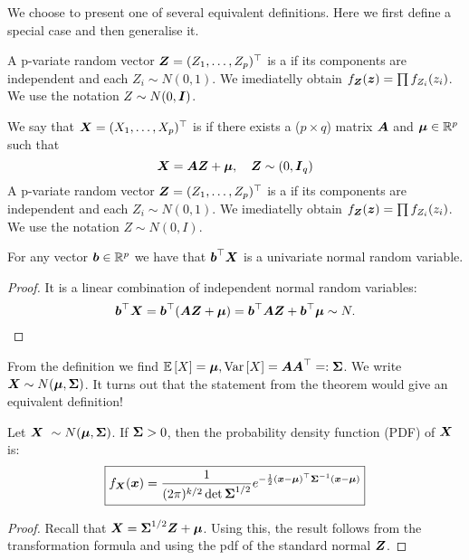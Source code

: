 We choose to present one of several equivalent definitions. Here we first define a special case and then generalise it. 
\begin{definition}
    A p-variate random vector $\boldsymbol{Z}=(Z_1, \dots, Z_p)^\top$ is a  if its components are independent and each $Z_i\sim N(0,1)$. We imediatelly obtain $f_{\boldsymbol{Z}}(\boldsymbol{z}) = \prod f_{Z_i} (z_i)$. We use the notation $Z\sim N(0, \boldsymbol{I})$.
\end{definition}
\begin{definition}
    We say that $\boldsymbol{X} = (X_1,\dots, X_p)^\top$ is  if there exists a ($p\times q$) matrix $\boldsymbol{A}$ and $\boldsymbol{\mu}\in\mathbb{R}^p$ such that 
    $$
        \boldsymbol{X} = \boldsymbol{A} \boldsymbol{Z} + \boldsymbol{\mu}, \quad \boldsymbol{Z} \sim (0, \boldsymbol{I}_q)
    $$
    A p-variate random vector $\boldsymbol{Z}=(Z_1, \dots, Z_p)^\top$ is a  if its components are independent and each $Z_i\sim N(0,1)$. We imediatelly obtain $f_{\boldsymbol{Z}}(\boldsymbol{z}) = \prod f_{Z_i} (z_i)$. We use the notation $Z\sim N(0, I)$.
\end{definition}
\begin{theorem}
    For any vector $\boldsymbol{b}\in\mathbb{R}^p$ we have that $\boldsymbol{b}^\top \boldsymbol{X}$ is a univariate normal random variable.
\end{theorem}
\begin{proof}
    It is a linear combination of independent normal random variables:
    $$
        \boldsymbol{b}^\top \boldsymbol{X} = \boldsymbol{b}^\top(\boldsymbol{A}\boldsymbol{Z} + \boldsymbol{\mu}) = \boldsymbol{b}^\top \boldsymbol{A} \boldsymbol{Z} + \boldsymbol{b}^\top\boldsymbol{\mu} \sim N. 
    $$
\end{proof}
From the definition we find $\mathbb{E}\left[X\right] = \boldsymbol{\mu}, \mathrm{Var}\left[X\right] = \boldsymbol{A}\boldsymbol{A}^\top =: \boldsymbol{\Sigma}$. We write $\X \sim N(\M, \SS)$. It turns out that the statement from the theorem would give an equivalent definition!
\begin{theorem}
    Let $\X \sim N(\M, \SS)$. If $\boldsymbol{\Sigma} > 0$, then the probability density function (PDF) of $\boldsymbol{X}$ is:
    \begin{equation}
        \boxed{
            f_{\boldsymbol{X}} (\boldsymbol{x}) = \frac{1}{(2\pi)^{k/2}\det{\boldsymbol{\Sigma}}^{1/2}} e^{-\frac{1}{2}(\boldsymbol{x}-\boldsymbol{\mu})^\top\boldsymbol{\Sigma}^{-1}(\boldsymbol{x}-\boldsymbol{\mu})}
        }        
    \end{equation}
\end{theorem}
\begin{proof}
    Recall that $\boldsymbol{X} = \boldsymbol{\Sigma}^{1/2}\boldsymbol{Z} + \boldsymbol{\mu}$. Using this, the result follows from the transformation formula and using the pdf of the standard normal $\boldsymbol{Z}$.  
\end{proof}
 
